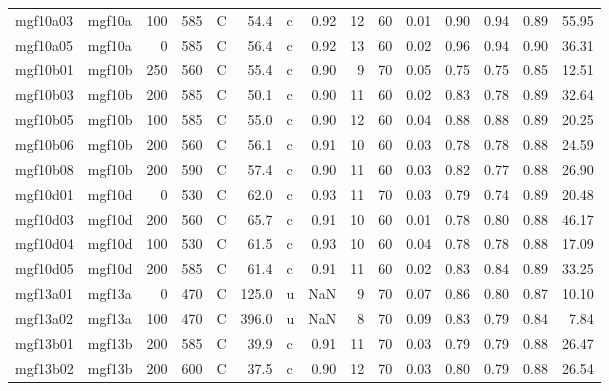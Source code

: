 \documentclass{article}
\begin{document}
\begin{landscape}
\begin{longtable}{llrrlrlrrrrrrrr}
    mgf10a03 &     mgf10a &  100 &  585 &     C &    54.4 &   c &  0.92 &  12 &         60 &  0.01 &  0.90 &  0.94 &  0.89 &   55.95 \\
    mgf10a05 &     mgf10a &    0 &  585 &     C &    56.4 &   c &  0.92 &  13 &         60 &  0.02 &  0.96 &  0.94 &  0.90 &   36.31 \\
    mgf10b01 &     mgf10b &  250 &  560 &     C &    55.4 &   c &  0.90 &   9 &         70 &  0.05 &  0.75 &  0.75 &  0.85 &   12.51 \\
    mgf10b03 &     mgf10b &  200 &  585 &     C &    50.1 &   c &  0.90 &  11 &         60 &  0.02 &  0.83 &  0.78 &  0.89 &   32.64 \\
    mgf10b05 &     mgf10b &  100 &  585 &     C &    55.0 &   c &  0.90 &  12 &         60 &  0.04 &  0.88 &  0.88 &  0.89 &   20.25 \\
    mgf10b06 &     mgf10b &  200 &  560 &     C &    56.1 &   c &  0.91 &  10 &         60 &  0.03 &  0.78 &  0.78 &  0.88 &   24.59 \\
    mgf10b08 &     mgf10b &  200 &  590 &     C &    57.4 &   c &  0.90 &  11 &         60 &  0.03 &  0.82 &  0.77 &  0.88 &   26.90 \\
    mgf10d01 &     mgf10d &    0 &  530 &     C &    62.0 &   c &  0.93 &  11 &         70 &  0.03 &  0.79 &  0.74 &  0.89 &   20.48 \\
    mgf10d03 &     mgf10d &  200 &  560 &     C &    65.7 &   c &  0.91 &  10 &         60 &  0.01 &  0.78 &  0.80 &  0.88 &   46.17 \\
    mgf10d04 &     mgf10d &  100 &  530 &     C &    61.5 &   c &  0.93 &  10 &         60 &  0.04 &  0.78 &  0.78 &  0.88 &   17.09 \\
    mgf10d05 &     mgf10d &  200 &  585 &     C &    61.4 &   c &  0.91 &  11 &         60 &  0.02 &  0.83 &  0.84 &  0.89 &   33.25 \\
    mgf13a01 &     mgf13a &    0 &  470 &     C &   125.0 &   u &   NaN &   9 &         70 &  0.07 &  0.86 &  0.80 &  0.87 &   10.10 \\
    mgf13a02 &     mgf13a &  100 &  470 &     C &   396.0 &   u &   NaN &   8 &         70 &  0.09 &  0.83 &  0.79 &  0.84 &    7.84 \\
    mgf13b01 &     mgf13b &  200 &  585 &     C &    39.9 &   c &  0.91 &  11 &         70 &  0.03 &  0.79 &  0.79 &  0.88 &   26.47 \\
    mgf13b02 &     mgf13b &  200 &  600 &     C &    37.5 &   c &  0.90 &  12 &         70 &  0.03 &  0.80 &  0.79 &  0.88 &   26.54 \\

\end{longtable}
\end{landscape}
\end{document}
